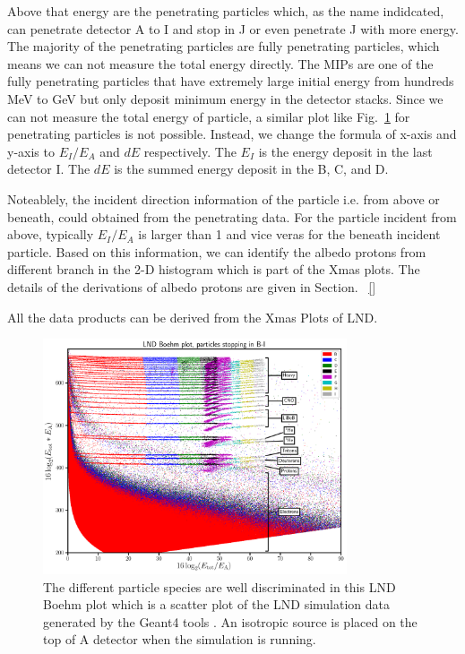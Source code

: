Above that energy are the penetrating particles which, as the name indidcated, can penetrate detector A to I and stop in J or even penetrate J with more energy. The majority of the penetrating particles are fully penetrating particles, which means we can not measure the total energy directly. The \acp{MIP} are one of the fully penetrating particles that have extremely large initial energy from hundreds MeV to GeV but only deposit minimum energy in the detector stacks.
Since we can not measure the total energy of particle, a similar plot like Fig.~\ref{Fig:LND-Boehm-plot} for penetrating particles is not possible. Instead, we change the formula of x-axis and y-axis to $E_I/E_A$ and $dE$ respectively. The $E_I$ is the energy deposit in the last detector I. The $dE$ is the summed energy deposit in the B, C, and D.

Noteablely, the incident direction information of the particle i.e. from above or beneath, could obtained from the penetrating data. For the particle incident from above, typically $E_I/E_A$ is larger than 1 and vice veras for the beneath incident particle. 
Based on this information, we can identify the albedo protons from different branch in the 2-D histogram which is part of the Xmas plots.
The details of the derivations of albedo protons are given in Section. ~\ref{}

All the data products can be derived from the Xmas Plots of LND.

\begin{figure}
    \centering
    \includegraphics[width=0.8\textwidth]{images/LND_Boehm_plot_isotropic_on_top_of_A_annotated.png}
    \caption[LND Boehm plot of stopping particles based on the simulated data]{The different particle species are well discriminated in this LND Boehm plot which is a scatter plot of the \ac{LND} simulation data generated by the \ac{Geant4} tools \citet{Agostinelli-2003}. An isotropic source is placed on the top of A detector when the simulation is running.}
    \label{Fig:LND-Boehm-plot}
\end{figure}


